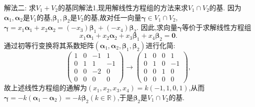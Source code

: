 \documentclass[../../main.tex]{subfiles}%
\begin{document}
\begin{solution}
{\color{blue}解法二:} 求\(V_1 + V_2\)的基同解法1,现用解线性方程组的方法来求\(V_1\cap V_2\)的基. 因为\(\boldsymbol{\alpha}_1,\boldsymbol{\alpha}_2\)是\(V_1\)的基,\(\boldsymbol{\beta}_1,\boldsymbol{\beta}_2\)是\(V_2\)的基,故对任一向量\(\boldsymbol{\gamma}\in V_1\cap V_2\),\(\boldsymbol{\gamma}=x_1\boldsymbol{\alpha}_1 + x_2\boldsymbol{\alpha}_2=(-x_3)\boldsymbol{\beta}_1 + (-x_4)\boldsymbol{\beta}_2\). 因此,求向量\(\boldsymbol{\gamma}\)等价于求解线性方程组
\[
x_1\boldsymbol{\alpha}_1 + x_2\boldsymbol{\alpha}_2 + x_3\boldsymbol{\beta}_1 + x_4\boldsymbol{\beta}_2=\boldsymbol{0}.
\]
通过初等行变换将其系数矩阵\((\boldsymbol{\alpha}_1,\boldsymbol{\alpha}_2,\boldsymbol{\beta}_1,\boldsymbol{\beta}_2)\)进行化简:
\[
\begin{pmatrix}
1&0&-1&1\\
0&1&1&-1\\
0&0&-2&0\\
0&0&0&0
\end{pmatrix}\to
\begin{pmatrix}
1&0&0&1\\
0&1&0&-1\\
0&0&1&0\\
0&0&0&0
\end{pmatrix},
\]
故上述线性方程组的通解为\((x_1,x_2,x_3,x_4)=k(-1,1,0,1)\),从而\(\boldsymbol{\gamma}=-k(\boldsymbol{\alpha}_1 - \boldsymbol{\alpha}_2)=-k\boldsymbol{\beta}_2(k\in\mathbb{R})\),于是\(\boldsymbol{\beta}_2\)是\(V_1\cap V_2\)的基. 

\end{solution}
\end{document}
